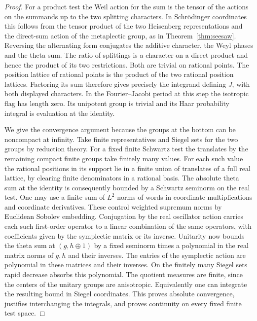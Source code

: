\documentclass[a4paper,11pt]{article}
\theoremstyle{definition}
\theoremstyle{remark}
\numberwithin{equation}{section}
\begin{document}
\begin{proof}
For a product test the Weil action for the sum is the tensor of the
actions on the summands up to the two splitting characters. In
Schr\"odinger coordinates this follows from the tensor product of the
two Heisenberg representations and the direct-sum action of the
metaplectic group, as in Theorem~\ref{thm:seesaw}. Reversing the
alternating form conjugates the additive character, the Weyl phases
and the theta sum. The ratio of splittings is a character on a direct
product and hence the product of its two restrictions. Both are
trivial on rational points. The position lattice of rational points
is the product of the two rational position lattices. Factoring its
sum therefore gives precisely the integrand defining \(J\), with
both displayed characters. In the Fourier--Jacobi period at this
step the isotropic flag has length zero. Its unipotent group is
trivial and its Haar probability integral is evaluation at the identity.

We give the convergence argument because the groups at the bottom
can be noncompact at infinity. Take finite representatives and Siegel
sets for the two groups by reduction theory. For a fixed finite
Schwartz test the translates by the remaining compact finite groups
take finitely many values. For each such value the rational positions
in its support lie in a finite union of translates of a full real
lattice, by clearing finite denominators in a rational basis.
The absolute theta sum at the identity is consequently bounded by
a Schwartz seminorm on the real test. One may use a finite sum of
\(L^2\)-norms of words in coordinate multiplications and coordinate
derivatives. These control weighted supremum norms by Euclidean
Sobolev embedding. Conjugation by the real oscillator action carries
each such first-order operator to a linear combination of the same
operators, with coefficients given by the symplectic matrix or its
inverse. Unitarity now bounds the theta sum at \((g,h\oplus1)\) by
a fixed seminorm times a polynomial in the real matrix norms of
\(g,h\) and their inverses. The entries of the symplectic action
are polynomial in these matrices and their inverses. On the finitely
many Siegel sets rapid decrease absorbs this polynomial. The quotient
measures are finite, since the centers of the unitary groups are
anisotropic. Equivalently one can integrate the resulting bound in
Siegel coordinates. This proves absolute convergence, justifies
interchanging the integrals, and proves continuity on every fixed
finite test space.


\end{proof}
\end{document}
